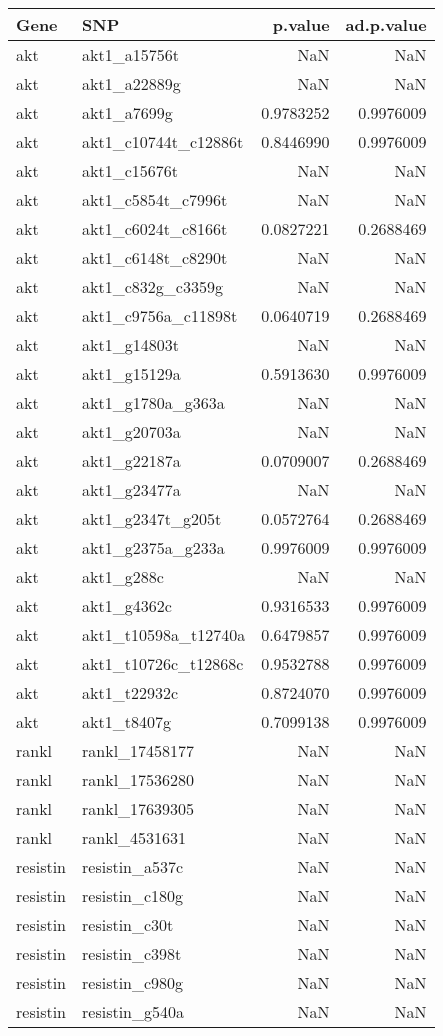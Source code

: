 \documentclass[
]{article}
\begin{document}
\begin{longtable}[]{@{}llrr@{}}
\toprule()
Gene & SNP & p.value & ad.p.value \\
\midrule()
\endhead
akt & akt1\_a15756t & NaN & NaN \\
akt & akt1\_a22889g & NaN & NaN \\
akt & akt1\_a7699g & 0.9783252 & 0.9976009 \\
akt & akt1\_c10744t\_c12886t & 0.8446990 & 0.9976009 \\
akt & akt1\_c15676t & NaN & NaN \\
akt & akt1\_c5854t\_c7996t & NaN & NaN \\
akt & akt1\_c6024t\_c8166t & 0.0827221 & 0.2688469 \\
akt & akt1\_c6148t\_c8290t & NaN & NaN \\
akt & akt1\_c832g\_c3359g & NaN & NaN \\
akt & akt1\_c9756a\_c11898t & 0.0640719 & 0.2688469 \\
akt & akt1\_g14803t & NaN & NaN \\
akt & akt1\_g15129a & 0.5913630 & 0.9976009 \\
akt & akt1\_g1780a\_g363a & NaN & NaN \\
akt & akt1\_g20703a & NaN & NaN \\
akt & akt1\_g22187a & 0.0709007 & 0.2688469 \\
akt & akt1\_g23477a & NaN & NaN \\
akt & akt1\_g2347t\_g205t & 0.0572764 & 0.2688469 \\
akt & akt1\_g2375a\_g233a & 0.9976009 & 0.9976009 \\
akt & akt1\_g288c & NaN & NaN \\
akt & akt1\_g4362c & 0.9316533 & 0.9976009 \\
akt & akt1\_t10598a\_t12740a & 0.6479857 & 0.9976009 \\
akt & akt1\_t10726c\_t12868c & 0.9532788 & 0.9976009 \\
akt & akt1\_t22932c & 0.8724070 & 0.9976009 \\
akt & akt1\_t8407g & 0.7099138 & 0.9976009 \\
rankl & rankl\_17458177 & NaN & NaN \\
rankl & rankl\_17536280 & NaN & NaN \\
rankl & rankl\_17639305 & NaN & NaN \\
rankl & rankl\_4531631 & NaN & NaN \\
resistin & resistin\_a537c & NaN & NaN \\
resistin & resistin\_c180g & NaN & NaN \\
resistin & resistin\_c30t & NaN & NaN \\
resistin & resistin\_c398t & NaN & NaN \\
resistin & resistin\_c980g & NaN & NaN \\
resistin & resistin\_g540a & NaN & NaN \\
\bottomrule()
\end{longtable}
\end{document}
